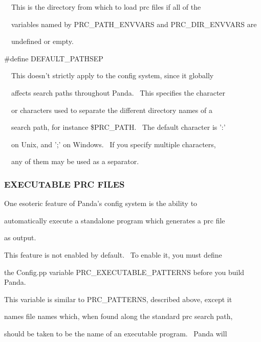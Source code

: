 \documentclass[a4paper]{article}
\begin{document}
\bigskip

{\color{black}
\ \ This is the directory from which to load prc files if all of the}

{\color{black}
\ \ variables named by PRC\_PATH\_ENVVARS and PRC\_DIR\_ENVVARS are}

{\color{black}
\ \ undefined or empty.}


\bigskip

{\color{black}
\#define DEFAULT\_PATHSEP}

{\color{black}
\ \ This doesn't strictly apply to the config system, since it globally}

{\color{black}
\ \ affects search paths throughout Panda. \ This specifies the character}

{\color{black}
\ \ or characters used to separate the different directory names of a}

{\color{black}
\ \ search path, for instance \$PRC\_PATH. \ The default character is ':'}

{\color{black}
\ \ on Unix, and ';' on Windows. \ If you specify multiple characters,}

{\color{black}
\ \ any of them may be used as a separator.}


\bigskip


\bigskip

\subsubsection[EXECUTABLE PRC FILES]{EXECUTABLE PRC FILES}
\hypertarget{RefHeading312441927442421}{}
\bigskip

{\color{black}
One esoteric feature of Panda's config system is the ability to}

{\color{black}
automatically execute a standalone program which generates a prc file}

{\color{black}
as output.}


\bigskip

{\color{black}
This feature is not enabled by default. \ To enable it, you must define}

{\color{black}
the Config.pp variable PRC\_EXECUTABLE\_PATTERNS before you build Panda.}

{\color{black}
This variable is similar to PRC\_PATTERNS, described above, except it}

{\color{black}
names file names which, when found along the standard prc search path,}

{\color{black}
should be taken to be the name of an executable program. \ Panda will}
\end{document}
